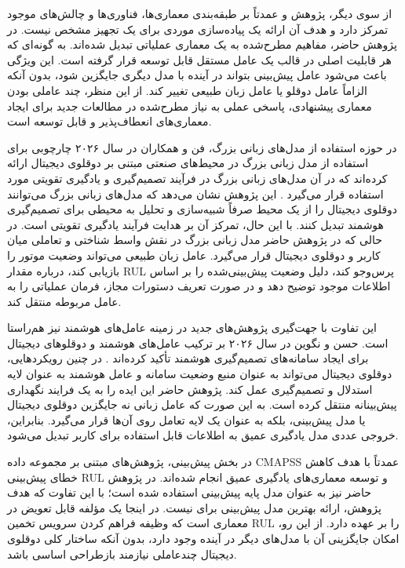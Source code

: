 از سوی دیگر، پژوهش 
و
عمدتاً بر طبقه‌بندی معماری‌ها،
فناوری‌ها و چالش‌های موجود تمرکز دارد و هدف آن ارائه یک پیاده‌سازی
موردی برای یک تجهیز مشخص نیست. در پژوهش حاضر، مفاهیم مطرح‌شده به یک معماری عملیاتی تبدیل شده‌اند. به گونه‌ای که هر قابلیت
اصلی در قالب یک عامل مستقل قابل توسعه قرار گرفته است. این ویژگی باعث
می‌شود عامل پیش‌بینی بتواند در آینده با مدل دیگری جایگزین شود، بدون
آنکه الزاماً عامل دوقلو یا عامل زبان طبیعی تغییر کند. از این منظر،
چند عاملی بودن معماری پیشنهادی، پاسخی عملی به نیاز مطرح‌شده در مطالعات
جدید برای ایجاد معماری‌های انعطاف‌پذیر و قابل توسعه است.

در حوزه استفاده از مدل‌های زبانی بزرگ،
 فن و همکاران در سال ۲۰۲۶
چارچوبی برای استفاده از مدل زبانی بزرگ در محیط‌های صنعتی مبتنی بر
دوقلوی دیجیتال ارائه کرده‌اند که در آن مدل‌های زبانی بزرگ در فرآیند تصمیم‌گیری و
یادگیری تقویتی مورد استفاده قرار می‌گیرد \cite{fan2026llmrl}. این
پژوهش نشان می‌دهد که مدل‌های زبانی بزرگ می‌توانند دوقلوی دیجیتال را از یک محیط
صرفاً شبیه‌سازی و تحلیل به محیطی برای تصمیم‌گیری هوشمند تبدیل کنند.
با این حال، تمرکز آن بر هدایت فرآیند یادگیری تقویتی است. در حالی که
در پژوهش حاضر مدل زبانی بزرگ در نقش واسط شناختی و تعاملی میان کاربر و دوقلوی
دیجیتال قرار می‌گیرد. عامل زبان طبیعی می‌تواند وضعیت موتور را
بازیابی کند، درباره مقدار \gls{RUL} پرس‌وجو کند، دلیل وضعیت پیش‌بینی‌شده را
بر اساس اطلاعات موجود توضیح دهد و در صورت تعریف دستورات مجاز، فرمان
عملیاتی را به عامل مربوطه منتقل کند.

این تفاوت با جهت‌گیری پژوهش‌های جدید در زمینه عامل‌های هوشمند نیز
هم‌راستا است.
 حسن
 و 
 نگوین
 در سال ۲۰۲۶ بر ترکیب عامل‌های هوشمند و
دوقلوهای دیجیتال برای ایجاد سامانه‌های تصمیم‌گیری هوشمند تأکید
کرده‌اند \cite{hasan2026agenticdt}. در چنین رویکردهایی، دوقلوی دیجیتال
می‌تواند به عنوان منبع وضعیت سامانه و عامل هوشمند به عنوان لایه
استدلال و تصمیم‌گیری عمل کند. پژوهش حاضر این ایده را به یک فرایند
نگهداری پیش‌بینانه منتقل کرده است. به این صورت که عامل زبانی نه
جایگزین دوقلوی دیجیتال یا مدل پیش‌بینی، بلکه به عنوان یک لایه تعامل
روی آن‌ها قرار می‌گیرد. بنابراین، خروجی عددی مدل یادگیری عمیق به
اطلاعات قابل استفاده برای کاربر تبدیل می‌شود.

در بخش پیش‌بینی، پژوهش‌های مبتنی بر مجموعه داده \gls{CMAPSS} عمدتاً
با هدف کاهش خطای پیش‌بینی \gls{RUL} و توسعه معماری‌های یادگیری عمیق انجام
شده‌اند. در پژوهش حاضر نیز  به عنوان مدل پایه پیش‌بینی استفاده
شده است؛ با این تفاوت که هدف پژوهش، ارائه بهترین مدل پیش‌بینی برای
 نیست. 
در اینجا یک مؤلفه قابل تعویض در معماری است که وظیفه
فراهم کردن سرویس تخمین \gls{RUL} را بر عهده دارد. از این رو، امکان جایگزینی
آن با مدل‌های دیگر در آینده وجود دارد، بدون آنکه ساختار کلی دوقلوی
دیجیتال چندعاملی نیازمند بازطراحی اساسی باشد.


